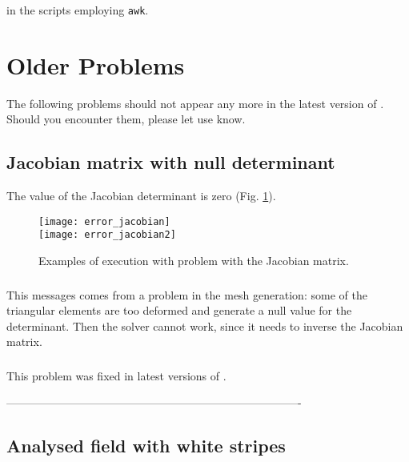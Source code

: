 in the scripts employing \texttt{awk}.


\section{Older Problems}

The following problems should not appear any more in the latest version of \diva. Should you encounter them, please let use know.


\subsection{Jacobian matrix with null determinant}

The value of the Jacobian determinant is zero (Fig. \ref{fig:error_jacobian}).
\begin{figure}[htpb]
\centering
\texttt{[image: error\_jacobian]}\\
\texttt{[image: error\_jacobian2]}
\caption{Examples of \diva execution with problem with the Jacobian matrix. \label{fig:error_jacobian}}
\end{figure}

\subsubsection{\question}

This messages comes from a problem in the mesh generation: some of the triangular elements are too deformed and generate a null value for the determinant. Then the solver cannot work, since it needs to inverse the Jacobian matrix.


\subsubsection{\answer}

This problem was fixed in latest versions of \diva. 

-------------------------------------------------------------------------------

\subsection{Analysed field with white stripes}

